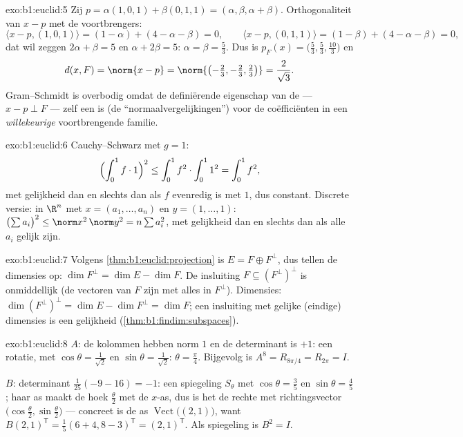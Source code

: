 \begin{solution}{exo:b1:euclid:5}
Zij $p = \alpha(1,0,1) + \beta(0,1,1) = (\alpha, \beta, \alpha +
\beta)$. Orthogonaliteit van $x - p$ met de voortbrengers:
\[
\langle x - p, (1,0,1)\rangle = (1 - \alpha) + (4 - \alpha - \beta)
= 0,
\qquad
\langle x - p, (0,1,1)\rangle = (1 - \beta) + (4 - \alpha - \beta)
= 0,
\]
dat wil zeggen $2\alpha + \beta = 5$ en $\alpha + 2\beta = 5$:
$\alpha = \beta = \frac53$. Dus is $p_F(x) = \bigl(\frac53,
\frac53, \frac{10}{3}\bigr)$ en
\[
d(x, F) = \norm{x - p} =
\norm{\bigl(-\tfrac23, -\tfrac23, \tfrac23\bigr)} =
\frac{2}{\sqrt 3} .
\]
Gram--Schmidt is overbodig omdat de definiërende eigenschap van de
 --- $x - p \perp F$ --- zelf een  is (de
``normaalvergelijkingen'') voor de coëfficiënten in een
\emph{willekeurige} voortbrengende familie.
\end{solution}

\begin{solution}{exo:b1:euclid:6}
Cauchy--Schwarz met $g = 1$:
\[
\Bigl(\int_0^1 f \cdot 1\Bigr)^2 \leq \int_0^1 f^2 \cdot \int_0^1
1^2 = \int_0^1 f^2 ,
\]
met gelijkheid dan en slechts dan als $f$ evenredig is met $1$, dus
constant. Discrete versie: in $\R^n$ met $x = (a_1, \dots, a_n)$ en
$y = (1, \dots, 1)$: $\bigl(\sum a_i\bigr)^2 \leq \norm x^2\, \norm
y^2 = n \sum a_i^2$, met gelijkheid dan en slechts dan als alle
$a_i$ gelijk zijn.
\end{solution}

\begin{solution}{exo:b1:euclid:7}
Volgens \cref{thm:b1:euclid:projection} is $E = F \oplus F^\perp$,
dus tellen de dimensies op: $\dim F^\perp = \dim E - \dim F$. De
insluiting $F \subseteq (F^\perp)^\perp$ is onmiddellijk (de
vectoren van $F$ zijn  met alles in $F^\perp$).
Dimensies: $\dim(F^\perp)^\perp = \dim E - \dim F^\perp = \dim F$;
een insluiting met gelijke (eindige) dimensies is een gelijkheid
(\cref{thm:b1:findim:subspaces}).
\end{solution}

\begin{solution}{exo:b1:euclid:8}
$A$: de kolommen hebben norm $1$ en de determinant is $+1$: een
rotatie, met $\cos\theta = \frac{1}{\sqrt2}$ en $\sin\theta =
\frac{1}{\sqrt2}$: $\theta = \frac\pi4$. Bijgevolg is $A^8 =
R_{8\pi/4} = R_{2\pi} = I$.

$B$: determinant $\frac{1}{25}(-9 - 16) = -1$: een spiegeling
$S_\theta$ met $\cos\theta = \frac35$ en $\sin\theta = \frac45$;
haar as maakt de hoek $\frac\theta2$ met de $x$-as, dus is het de
rechte met richtingsvector $\bigl(\cos\frac\theta2,
\sin\frac\theta2\bigr)$ --- concreet is de as
$\operatorname{Vect}\bigl((2, 1)\bigr)$, want $B(2,1)^{\mathsf T} =
\frac15(6+4, 8-3)^{\mathsf T} = (2,1)^{\mathsf T}$. Als spiegeling
is $B^2 = I$.
\end{solution}

